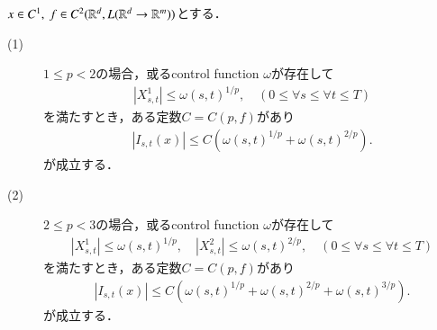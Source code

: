 	\begin{screen}
		\begin{lem}\label{lem:lemma_for_Young_integral}
			$x \in C^1,\ f \in C^2(\mathbb{R}^d,L(\mathbb{R}^d \rightarrow \mathbb{R}^m))$とする．
			\begin{description}
				\item[(1)]
					$1 \leq p < 2$の場合，或るcontrol function $\omega$が存在して
					\begin{align}
						\left| X^1_{s,t} \right|
						\leq \omega(s,t)^{1/p},
						\quad (0 \leq \forall s \leq \forall t \leq T)
					\end{align}
					を満たすとき，ある定数$C=C(p,f)$があり
					\begin{align}
						\left|I_{s,t}(x) \right|
						\leq C\left( \omega(s,t)^{1/p} + \omega(s,t)^{2/p} \right).
					\end{align}
					が成立する．
				\item[(2)] $2 \leq p < 3$の場合，或るcontrol function $\omega$が存在して
					\begin{align}
						\left| X^1_{s,t} \right| \leq \omega(s,t)^{1/p},
						\quad \left| X^2_{s,t} \right| \leq \omega(s,t)^{2/p},
						\quad (0 \leq \forall s \leq \forall t \leq T)
					\end{align}
					を満たすとき，ある定数$C=C(p,f)$があり
					\begin{align}
						\left|I_{s,t}(x) \right|
						\leq C\left( \omega(s,t)^{1/p} + \omega(s,t)^{2/p} + \omega(s,t)^{3/p} \right).
					\end{align}
					が成立する．
			\end{description}
		\end{lem}
	\end{screen}
	
